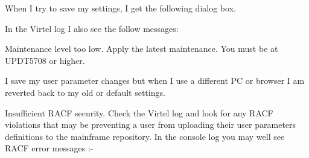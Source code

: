 \documentclass[letterpaper,10pt,english]{sphinxmanual}
\begin{document}
When I try to save my settings, I get the following dialog box.


In the Virtel log I also see the follow messages:

\begin{sphinxVerbatim}[commandchars=\\\{\}]
         
             
        
          
     
           
\end{sphinxVerbatim}


Maintenance level too low. Apply the latest maintenance. You must be at UPDT5708 or higher.


I save my user parameter changes but when I use a different PC or browser I am reverted back to my old or default settings.


Insufficient RACF security. Check the Virtel log and look for any RACF violations that may be preventing a user from uploading their user parameters definitions to the mainframe repository. In the console log you may well see RACF error messages :-
\end{document}
